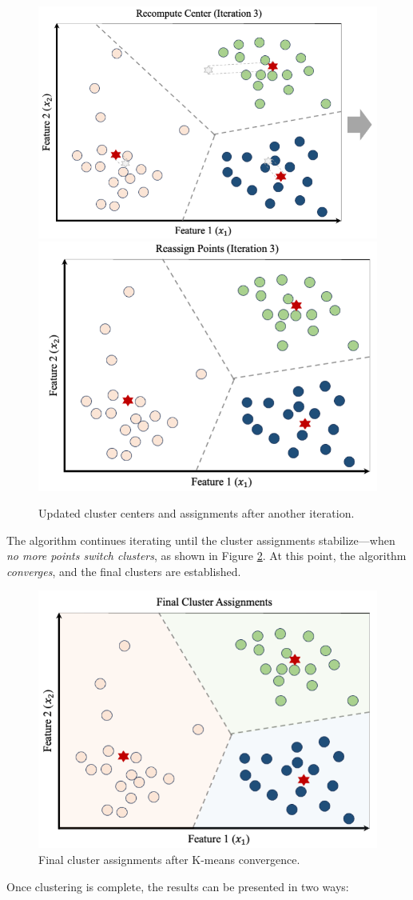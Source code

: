 \documentclass[
]{book}
\theoremstyle{definition}
\theoremstyle{definition}
\theoremstyle{definition}
\theoremstyle{definition}
\theoremstyle{remark}
\begin{document}
\begin{figure}

{\centering \includegraphics[width=0.45\linewidth]{images/cluster_ex_6} \includegraphics[width=0.45\linewidth]{images/cluster_ex_7} 

}

\caption{Updated cluster centers and assignments after another iteration.}\label{fig:cluster-ex-6}
\end{figure}

The algorithm continues iterating until the cluster assignments stabilize---when \emph{no more points switch clusters}, as shown in Figure \ref{fig:cluster-ex-8}. At this point, the algorithm \emph{converges}, and the final clusters are established.

\begin{figure}

{\centering \includegraphics[width=0.45\linewidth]{images/cluster_ex_8} 

}

\caption{Final cluster assignments after K-means convergence.}\label{fig:cluster-ex-8}
\end{figure}

Once clustering is complete, the results can be presented in two ways:
\end{document}
